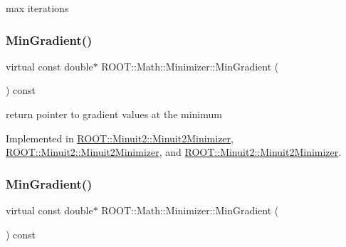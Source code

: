 max iterations 

\mbox{\label{classROOT_1_1Math_1_1Minimizer_a861036d38a21d9a60d44e068397307af}} 
\subsubsection{\texorpdfstring{MinGradient()}{MinGradient()}\hspace{0.1cm}{\footnotesize\ttfamily [1/3]}}
{\footnotesize\ttfamily virtual const double$\ast$ R\+O\+O\+T\+::\+Math\+::\+Minimizer\+::\+Min\+Gradient (\begin{DoxyParamCaption}{ }\end{DoxyParamCaption}) const\hspace{0.3cm}{\ttfamily [pure virtual]}}



return pointer to gradient values at the minimum 



Implemented in \mbox{\hyperlink{classROOT_1_1Minuit2_1_1Minuit2Minimizer_a52c6b3a13108b64366b1acd43f7e2b9a}{R\+O\+O\+T\+::\+Minuit2\+::\+Minuit2\+Minimizer}}, \mbox{\hyperlink{classROOT_1_1Minuit2_1_1Minuit2Minimizer_a52c6b3a13108b64366b1acd43f7e2b9a}{R\+O\+O\+T\+::\+Minuit2\+::\+Minuit2\+Minimizer}}, and \mbox{\hyperlink{classROOT_1_1Minuit2_1_1Minuit2Minimizer_a52c6b3a13108b64366b1acd43f7e2b9a}{R\+O\+O\+T\+::\+Minuit2\+::\+Minuit2\+Minimizer}}.

\mbox{\label{classROOT_1_1Math_1_1Minimizer_a861036d38a21d9a60d44e068397307af}} 
\subsubsection{\texorpdfstring{MinGradient()}{MinGradient()}\hspace{0.1cm}{\footnotesize\ttfamily [2/3]}}
{\footnotesize\ttfamily virtual const double$\ast$ R\+O\+O\+T\+::\+Math\+::\+Minimizer\+::\+Min\+Gradient (\begin{DoxyParamCaption}{ }\end{DoxyParamCaption}) const\hspace{0.3cm}{\ttfamily [pure virtual]}}



